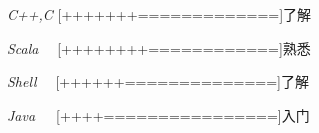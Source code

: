 \begin{cvline}
  \cvsingleline 
    {
      \begin{cvitems}
          \item {\it{C++,C}}  {[+++++++=============]了解}
          \item {\it{Scala\,\,\,\,\,\,}}  {[++++++++============]熟悉}
          \item {\it{Shell\,\,\,\,\,\,}}  {[++++++==============]了解}
          \item {\it{Java\,\,\,\,\,\,\,}}   {[++++================]入门}
      \end{cvitems}
    }
\end{cvline}
